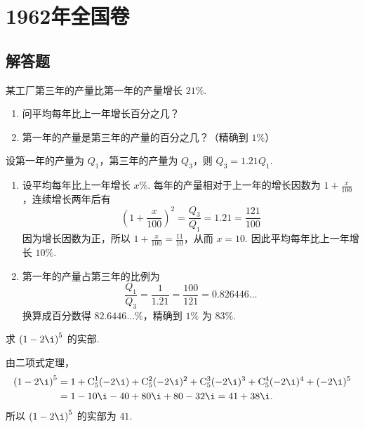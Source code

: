 \documentclass[UTF8,a4paper,oneside,11pt]{ctexbook}
\begin{document}
\mainmatter

\chapter{1962年全国卷}

\section{解答题}

\begin{problem}
某工厂第三年的产量比第一年的产量增长 \(21\%\).

\begin{enumerate}
\item 问平均每年比上一年增长百分之几？
\item 第一年的产量是第三年的产量的百分之几？（精确到 \(1\%\)）
\end{enumerate}
\end{problem}

\begin{solution}
设第一年的产量为 \(Q_1\)，第三年的产量为 \(Q_3\)，则 \(Q_3=1.21Q_1\).

\begin{enumerate}
\item 设平均每年比上一年增长 \(x\%\). 每年的产量相对于上一年的增长因数为 \(1+\frac{x}{100}\)，连续增长两年后有
\[
\left(1+\frac{x}{100}\right)^2=\frac{Q_3}{Q_1}=1.21=\frac{121}{100}
\]
因为增长因数为正，所以 \(1+\frac{x}{100}=\frac{11}{10}\)，从而 \(x=10\). 因此平均每年比上一年增长 \(10\%\).

\item 第一年的产量占第三年的比例为
\[
\frac{Q_1}{Q_3}=\frac{1}{1.21}=\frac{100}{121}=0.826446\ldots
\]
换算成百分数得 \(82.6446\ldots\%\)，精确到 \(1\%\) 为 \(83\%\).
\end{enumerate}
\end{solution}

\begin{problem}
求 \(\left(1-2\i\right)^5\) 的实部.
\end{problem}

\begin{solution}
由二项式定理，
\[
\begin{aligned}
\left(1-2\i\right)^5
&=1+\mathrm C_5^1(-2\i)+\mathrm C_5^2(-2\i)^2+\mathrm C_5^3(-2\i)^3+\mathrm C_5^4(-2\i)^4+(-2\i)^5\\
&=1-10\i-40+80\i+80-32\i=41+38\i.
\end{aligned}
\]
所以 \(\left(1-2\i\right)^5\) 的实部为 \(41\).
\end{solution}
\end{document}
